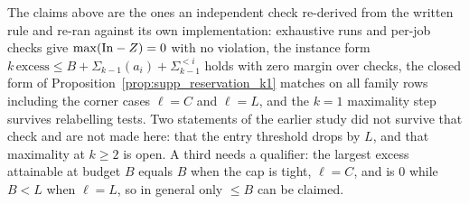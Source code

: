 The claims above are the ones an independent check re-derived from the written rule and
re-ran against its own implementation:  exhaustive runs and
 per-job checks give
$\max(\mathrm{In}-Z)=0$ with no violation, the instance form
$k\,\mathrm{excess} \le B+\Sigma_{k-1}(a_i)+\Sigma^{<i}_{k-1}$ holds with zero margin
over  checks, the closed form of
Proposition~\ref{prop:supp_reservation_k1} matches on all  family rows
including the corner cases $\ell = C$ and $\ell = L$, and the $k=1$ maximality step
survives  relabelling tests. Two statements of the earlier study did
not survive that check and are not made here: that the entry threshold drops by $L$, and
that maximality at $k \ge 2$ is open. A third needs a qualifier: the largest excess
attainable at budget $B$ equals $B$ when the cap is tight, $\ell = C$, and is $0$ while
$B < L$ when $\ell = L$, so in general only $\le B$ can be claimed.
